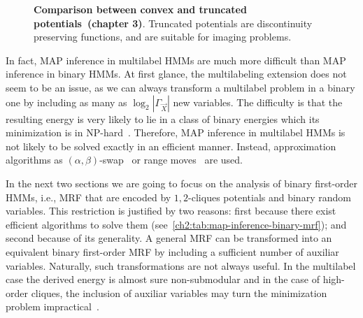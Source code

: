 \begin{figure}
\center
{}\hspace{1em}
\hspace{1em}
\caption{\textbf{Comparison between convex and truncated potentials~\cite{blake11markov}(chapter 3)}. Truncated potentials are discontinuity preserving functions, and are suitable for imaging problems.}
\label{ch2:fig:comparison-convex-truncated}
\end{figure}

In fact, MAP inference in multilabel HMMs are much more difficult than MAP inference in binary HMMs. At first glance, the multilabeling extension does not seem to be an issue, as we can always transform a multilabel problem in a binary one by including as many as $\log_2 |\Gamma_{\vec{X}}|$ new variables. The difficulty is that the resulting energy is very likely to lie in a class of binary energies which its minimization is in NP-hard~\cite{ramalingam08}. Therefore, MAP inference in multilabel HMMs is not likely to be solved exactly in an efficient manner. Instead, approximation algorithms as $(\alpha,\beta)$-swap~\cite{boykov01fast} or range moves~\cite{veksler07graph} are used.

In the next two sections we are going to focus on the analysis of binary first-order HMMs, i.e., MRF that are encoded by $1,2$-cliques potentials and binary random variables. This restriction is justified by two reasons: first because there exist efficient algorithms to solve them (see~\cref{ch2:tab:map-inference-binary-mrf}); and second because of its generality. A general MRF can be transformed into an equivalent binary first-order MRF by including a sufficient number of auxiliar variables. Naturally, such transformations are not always useful. In the multilabel case the derived energy is almost sure non-submodular and in the case of high-order cliques, the inclusion of auxiliar variables may turn the minimization problem impractical~\cite{ishikawa10}.


